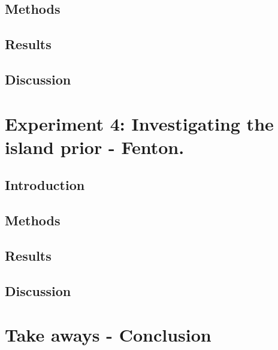 \subsection{Methods}

\subsection{Results}

\subsection{Discussion}



\section{Experiment 4: Investigating the island prior - Fenton.}
\subsection{Introduction}

\subsection{Methods}

\subsection{Results}

\subsection{Discussion}

\section{Take aways - Conclusion}



